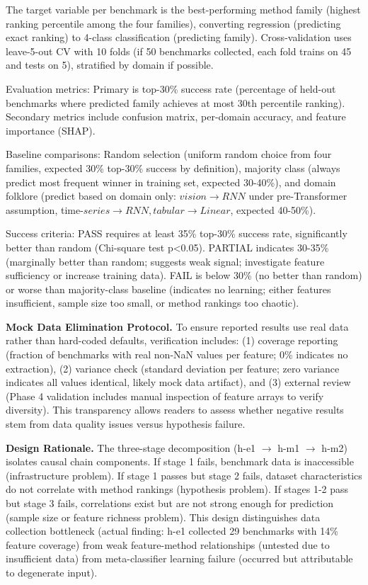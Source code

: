 The target variable per benchmark is the best-performing method family (highest ranking percentile among the four families), converting regression (predicting exact ranking) to 4-class classification (predicting family). Cross-validation uses leave-5-out CV with 10 folds (if 50 benchmarks collected, each fold trains on 45 and tests on 5), stratified by domain if possible.

Evaluation metrics: Primary is top-30\% success rate (percentage of held-out benchmarks where predicted family achieves at most 30th percentile ranking). Secondary metrics include confusion matrix, per-domain accuracy, and feature importance (SHAP).

Baseline comparisons: Random selection (uniform random choice from four families, expected 30\% top-30\% success by definition), majority class (always predict most frequent winner in training set, expected 30-40\%), and domain folklore (predict based on domain only: $vision\rightarrow RNN$ under pre-Transformer assumption, time-$series\rightarrow RNN, tabular\rightarrow Linear$, expected 40-50\%).

Success criteria: PASS requires at least 35\% top-30\% success rate, significantly better than random (Chi-square test p<0.05). PARTIAL indicates 30-35\% (marginally better than random; suggests weak signal; investigate feature sufficiency or increase training data). FAIL is below 30\% (no better than random) or worse than majority-class baseline (indicates no learning; either features insufficient, sample size too small, or method rankings too chaotic).

\textbf{Mock Data Elimination Protocol.} To ensure reported results use real data rather than hard-coded defaults, verification includes: (1) coverage reporting (fraction of benchmarks with real non-NaN values per feature; 0\% indicates no extraction), (2) variance check (standard deviation per feature; zero variance indicates all values identical, likely mock data artifact), and (3) external review (Phase 4 validation includes manual inspection of feature arrays to verify diversity). This transparency allows readers to assess whether negative results stem from data quality issues versus hypothesis failure.

\textbf{Design Rationale.} The three-stage decomposition (h-e1 $\rightarrow$ h-m1 $\rightarrow$ h-m2) isolates causal chain components. If stage 1 fails, benchmark data is inaccessible (infrastructure problem). If stage 1 passes but stage 2 fails, dataset characteristics do not correlate with method rankings (hypothesis problem). If stages 1-2 pass but stage 3 fails, correlations exist but are not strong enough for prediction (sample size or feature richness problem). This design distinguishes data collection bottleneck (actual finding: h-e1 collected 29 benchmarks with 14\% feature coverage) from weak feature-method relationships (untested due to insufficient data) from meta-classifier learning failure (occurred but attributable to degenerate input).
